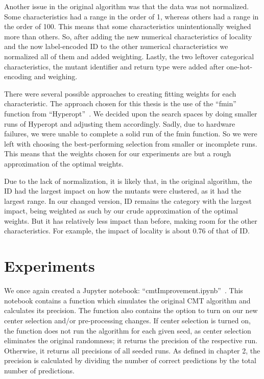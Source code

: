 \documentclass[twoside]{uva-inf-bachelor-thesis}
\begin{document}
Another issue in the original algorithm was that the data was not normalized. Some characteristics had a range in the order of 1, whereas others had a range in the order of 100. This means that some characteristics unintentionally weighed more than others. So, after adding the new numerical characteristics of locality and the now label-encoded ID to the other numerical characteristics we normalized all of them and added weighting. Lastly, the two leftover categorical characteristics, the mutant identifier and return type were added after one-hot-encoding and weighing.

There were several possible approaches to creating fitting weights for each characteristic. The approach chosen for this thesis is the use of the ``fmin'' function from ``Hyperopt''~\cite{Hyperopt}. We decided upon the search spaces by doing smaller runs of Hyperopt and adjusting them accordingly. Sadly, due to hardware failures, we were unable to complete a solid run of the fmin function. So we were left with choosing the best-performing selection from smaller or incomplete runs. This means that the weights chosen for our experiments are but a rough approximation of the optimal weights.

Due to the lack of normalization, it is likely that, in the original algorithm, the ID had the largest impact on how the mutants were clustered, as it had the largest range. In our changed version, ID remains the category with the largest impact, being weighted as such by our crude approximation of the optimal weights. But it has relatively less impact than before, making room for the other characteristics. For example, the impact of locality is about 0.76 of that of ID.

\section{Experiments}
We once again created a Jupyter notebook: ``cmtImprovement.ipynb''~\cite{aAbdalla-repo}. This notebook contains a function which simulates the original CMT algorithm and calculates its precision. The function also contains the option to turn on our new center selection and/or pre-processing changes. If center selection is turned on, the function does not run the algorithm for each given seed, as center selection eliminates the original randomness; it returns the precision of the respective run. Otherwise, it returns all precisions of all seeded runs. As defined in chapter 2, the precision is calculated by dividing the number of correct predictions by the total number of predictions.
\end{document}
